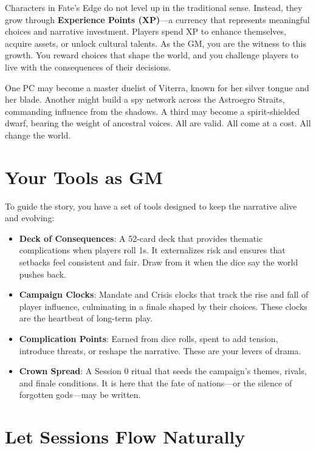 Characters in Fate's Edge do not level up in the traditional sense. Instead, they grow through \textbf{Experience Points (XP)}---a currency that represents meaningful choices and narrative investment. Players spend XP to enhance themselves, acquire assets, or unlock cultural talents. As the GM, you are the witness to this growth. You reward choices that shape the world, and you challenge players to live with the consequences of their decisions.

One PC may become a master duelist of Viterra, known for her silver tongue and her blade. Another might build a spy network across the Astroegro Straits, commanding influence from the shadows. A third may become a spirit-shielded dwarf, bearing the weight of ancestral voices. All are valid. All come at a cost. All change the world.

\section*{Your Tools as GM}

To guide the story, you have a set of tools designed to keep the narrative alive and evolving:

\begin{itemize}
    \item \textbf{Deck of Consequences}: A 52-card deck that provides thematic complications when players roll 1s. It externalizes risk and ensures that setbacks feel consistent and fair. Draw from it when the dice say the world pushes back.
    \item \textbf{Campaign Clocks}: Mandate and Crisis clocks that track the rise and fall of player influence, culminating in a finale shaped by their choices. These clocks are the heartbeat of long-term play.
    \item \textbf{Complication Points}: Earned from dice rolls, spent to add tension, introduce threats, or reshape the narrative. These are your levers of drama.
    \item \textbf{Crown Spread}: A Session 0 ritual that seeds the campaign's themes, rivals, and finale conditions. It is here that the fate of nations---or the silence of forgotten gods---may be written.
\end{itemize}

\section*{Let Sessions Flow Naturally}

